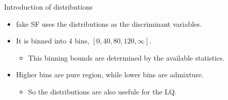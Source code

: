\documentclass[aspectratio=46, dvipdfmx, 10pt, t]{beamer} %
\begin{document}

\begin{frame}{Introduction of \mtw distributions}
  \begin{itemize}
    \item \ttbar fake SF uses the \mtw distributions as the discriminant variables.
    \item It is binned into 4 bins, $[0,40,80,120,\infty]$.
      \begin{itemize}
        \item This binning bounds are determined by the available statistics.
      \end{itemize}
      \vspp 
    \item Higher \mtw bins are pure \ttbar region, while lower bins are admixture.
      \begin{itemize}
        \item So the \mtw distributions are also usefule for the LQ.
      \end{itemize}
  \end{itemize}
\end{frame}
\end{document}
